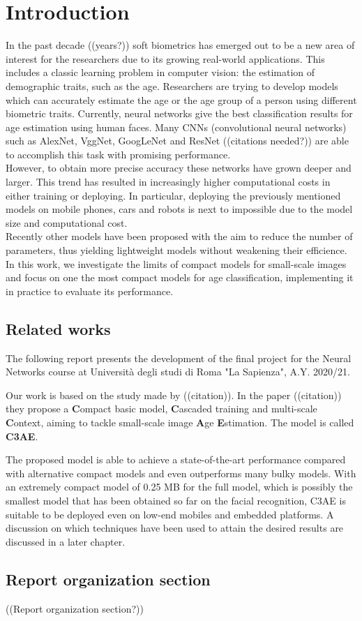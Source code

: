 
\chapter{Introduction}
In the past decade ((years?)) soft biometrics has emerged out to be a new area of interest for the researchers due to its growing real-world 
applications. This includes a classic learning problem in computer vision: the estimation of demographic traits, such as the age. 
Researchers are trying to develop models which can accurately estimate the age or the age group of a person using different 
biometric traits. Currently, neural networks give the best classification results for age estimation using human faces.
Many CNNs (convolutional neural networks) such as AlexNet, VggNet, GoogLeNet and ResNet ((citations needed?)) are able to accomplish this task with promising 
performance.\\
However, to obtain more precise accuracy these networks have grown deeper and larger. This trend has resulted in increasingly higher 
computational costs in either training or deploying. In particular, deploying the previously mentioned models on mobile phones, cars and 
robots is next to impossible due to the model size and computational cost.\\
Recently other models have been proposed with the aim to reduce the number of parameters, thus yielding lightweight models without weakening their efficience.
In this work, we investigate the limits of compact models for small-scale images and focus on one the most compact models for age classification, implementing it in 
practice to evaluate its performance.

\section{Related works}
The following report presents the development of the final project for the Neural Networks course at Università degli studi di Roma 
"La Sapienza", A.Y. 2020/21.

Our work is based on the study made by ((citation)).
In the paper ((citation)) they propose a \textbf{C}ompact basic model, \textbf{C}ascaded training and multi-scale \textbf{C}ontext, 
aiming to tackle small-scale image \textbf{A}ge \textbf{E}stimation. The model is called \textbf{C3AE}.

The proposed model is able to achieve a state-of-the-art performance compared with alternative compact models and even outperforms many 
bulky models. With an extremely compact model of 0.25 MB for the full model, which is possibly the smallest model that has been
obtained so far on the facial recognition, C3AE is suitable to be deployed even on low-end mobiles and embedded platforms.
A discussion on which techniques have been used to attain the desired results are discussed in a later chapter.\cite{prova}

\section{Report organization section}
((Report organization section?))